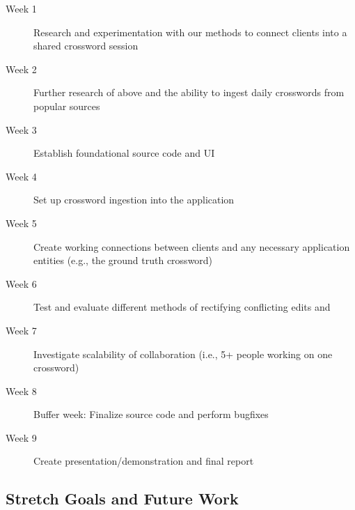 \documentclass{article}
\begin{document}
\begin{description}
    \item[Week 1] Research and experimentation with our methods to connect clients into a shared crossword session
    \item[Week 2] Further research of above and the ability to ingest daily crosswords from popular sources
    \item[Week 3] Establish foundational source code and UI
    \item[Week 4] Set up crossword ingestion into the application
    \item[Week 5] Create working connections between clients and any necessary application entities (e.g., the ground truth crossword)
    \item[Week 6] Test and evaluate different methods of rectifying conflicting edits and
    \item[Week 7] Investigate scalability of collaboration (i.e., 5+ people working on one crossword)
    \item[Week 8] Buffer week: Finalize source code and perform bugfixes
    \item[Week 9] Create presentation/demonstration and final report
\end{description}

\subsection{Stretch Goals and Future Work}

\newpage


\end{document}
